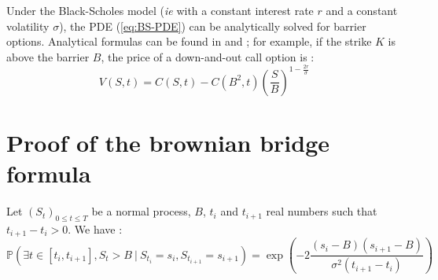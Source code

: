 \documentclass[a4paper,11pt,english]{book}
\begin{document}
Under the Black-Scholes model (\textit{ie} with a constant interest rate $r$ and a constant volatility $\sigma$), the PDE (\ref{eq:BS-PDE}) can be analytically solved for barrier options. Analytical formulas can be found in \cite{hull2016options} and \cite{wilmott2007paul} ; for example, if the strike $K$ is above the barrier $B$, the price of a down-and-out call option is :
$$V(S,t)=C(S,t)-C(B^2,t)(\frac{S}{B})^{1-\frac{2r}{\sigma}}$$

\section{Proof of the brownian bridge formula}
\label{appendix:brownian-bridge}
Let $(S_t)_{0 \leq t \leq T}$ be a normal process, $B$, $t_i$ and $t_{i+1}$ real numbers such that $t_{i+1}-t_i>0$. We have : 
\begin{equation}
    \mathbb{P}(\exists t \in [t_i,t_{i+1}],S_t>B~|~S_{t_i}=s_i,S_{t_{i+1}}=s_{i+1}) = \exp\left(-2 \frac{(s_i-B)(s_{i+1}-B)}{\sigma^2(t_{i+1}-t_i)}\right)
    \label{eq:brownian-bridge}
\end{equation}
    
\end{document}
